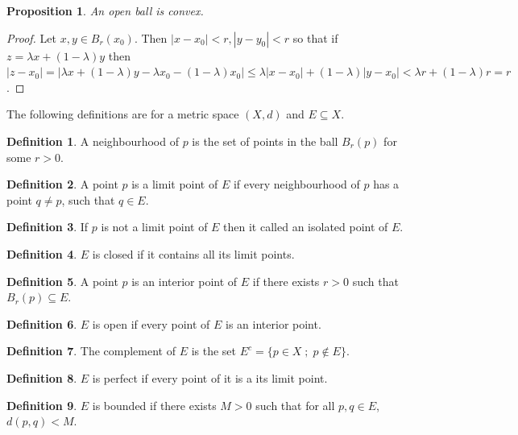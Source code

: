 \documentclass{article}
\theoremstyle{plain}
\numberwithin{thm}{section}
\theoremstyle{plain}
\newtheorem{prop}{Proposition}
\numberwithin{prop}{section}
\theoremstyle{definition}
\newtheorem{defn}{Definition}
\numberwithin{defn}{section}
\theoremstyle{remark}
\numberwithin{equation}{section}
\begin{document}
\begin{prop}\label{s1p2}
An open ball is convex.
\end{prop}
\begin{proof}
Let $x, y \in B_r(x_0)$. Then $|x - x_0| < r, |y - y_0| < r$ so that if $z =
\lambda x + (1 - \lambda)y$ then $|z - x_0| = |\lambda x + (1 - \lambda)y -
\lambda x_0 - (1 - \lambda)x_0| \le \lambda|x - x_0| + (1 - \lambda)|y - x_0|
< \lambda r + (1 - \lambda)r = r$.
\end{proof}

The following definitions are for a metric space $(X, d)$ and $E \subseteq X$.
\begin{defn}\label{s1d5}
A neighbourhood of $p$ is the set of points in the ball $B_r(p)$ for some $r>0$.
\end{defn}

\begin{defn}\label{s1d6}
A point $p$ is a limit point of $E$ if every neighbourhood of $p$ has a point
$q \ne p$, such that $q \in E$.
\end{defn}

\begin{defn}\label{s1d7}
If $p$ is not a limit point of $E$ then it called an isolated point of $E$.
\end{defn}

\begin{defn}\label{s1d8}
$E$ is closed if it contains all its limit points.
\end{defn}

\begin{defn}\label{s1d9}
A point $p$ is an interior point of $E$ if there exists $r > 0$ such that 
$B_r(p) \subseteq E$.
\end{defn}

\begin{defn}\label{s1d10}
$E$ is open if every point of $E$ is an interior point.
\end{defn}

\begin{defn}\label{s1d11}
The complement of $E$ is the set $E^c = \{p \in X \;;\; p \notin E\}$.
\end{defn}

\begin{defn}\label{s1d12}
$E$ is perfect if every point of it is a its limit point.
\end{defn}

\begin{defn}\label{s1d13}
$E$ is bounded if there exists $M > 0$ such that for all $p, q \in E$, 
$d(p, q) < M$.
\end{defn}
\end{document}
